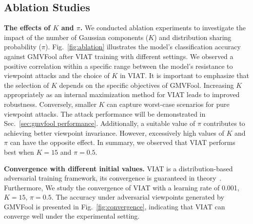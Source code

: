 \documentclass[10pt,journal,compsoc]{IEEEtran}
\begin{document}


\subsection{Ablation Studies} \label{sec:ablation}

\noindent \textbf{The effects of $K$ and $\pi$.} We conducted ablation experiments to investigate the impact of the number of Gaussian components ($K$) and distribution sharing probability ($\pi$). Fig.~\ref{fig:ablation} illustrates the model's classification accuracy against GMVFool after VIAT training with different settings. We observed a positive correlation within a specific range between the model's resistance to viewpoint attacks and the choice of $K$ in VIAT. It is important to emphasize that the selection of $K$ depends on the specific objectives of GMVFool. Increasing $K$ appropriately as an internal maximization method for VIAT leads to improved robustness. Conversely, smaller $K$ can capture worst-case scenarios for pure viewpoint attacks. The attack performance will be demonstrated in Sec.~\ref{sec:gmvfool performance}. Additionally, a suitable value of $\pi$ contributes to achieving better viewpoint invariance. However, excessively high values of $K$ and $\pi$ can have the opposite effect. In summary, we observed that VIAT performs best when $K\!\!=\!\!15$ and $\pi\!\!=\!\!0.5$.

\noindent \textbf{Convergence with different initial values.} VIAT is a distribution-based adversarial training framework, its convergence is guaranteed in theory~\cite{dong2020adversarial}. Furthermore, We study the convergence of VIAT with a learning rate of 0.001, $K\!\!=\!\!15$, $\pi\!\!=\!\!0.5$. The accuracy under adversarial viewpoints generated by GMVFool is presented in Fig.~\ref{fig:convergence}, indicating that VIAT can converge well under the experimental setting.
\end{document}
